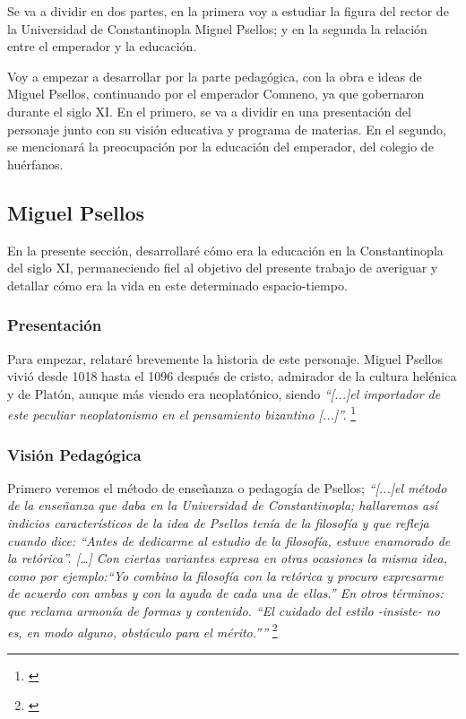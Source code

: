 

Se va a dividir en dos partes, en la primera voy a estudiar
la figura del rector de la Universidad de Constantinopla
Miguel Psellos; y en la segunda la relación entre el emperador y la
educación.

Voy a empezar a desarrollar por la parte pedagógica, con la obra e 
ideas de Miguel Psellos, continuando por el emperador Comneno, 
ya que gobernaron durante el siglo XI. En el primero, se va a dividir 
en una presentación del personaje junto con su visión educativa y 
programa de materias. En el segundo, se mencionará la preocupación por 
la educación del emperador, del colegio de huérfanos.

\subsection{Miguel Psellos}
En la presente sección, desarrollaré cómo era la educación en la 
Constantinopla del siglo XI, permaneciendo fiel al objetivo del 
presente trabajo de averiguar y detallar cómo era la vida en este 
determinado espacio-tiempo.

\subsubsection{Presentación}
Para empezar, relataré brevemente la historia de este personaje. 
Miguel Psellos vivió desde 1018 hasta el 1096 después de cristo, 
admirador de la cultura helénica y de Platón, aunque más viendo era 
neoplatónico, siendo \textit{“[...]el importador de este peculiar neoplatonismo 
en el pensamiento bizantino [...]”.}
\footnote{\cite[p.~160]{filosofia}}

\subsubsection{Visión Pedagógica}
Primero veremos el método de enseñanza o pedagogía de Psellos; 
\textit{“[...]el método de la enseñanza que daba en la Universidad de 
Constantinopla; hallaremos así indicios característicos de la idea de 
Psellos tenía de la filosofía y que refleja cuando dice: 
“Antes de dedicarme al estudio de la filosofía, estuve enamorado de 
la retórica”. […] Con ciertas variantes expresa en otras ocasiones 
la misma idea, como por ejemplo:“Yo combino la filosofía con la 
retórica y procuro expresarme de acuerdo con ambas y con la ayuda de 
cada una de ellas.” En otros términos: que reclama armonía de 
formas y contenido. “El cuidado del estilo -insiste- no es, 
en modo alguno, obstáculo para el mérito.””}
\footnote{\cite[p.~160]{filosofia}}

